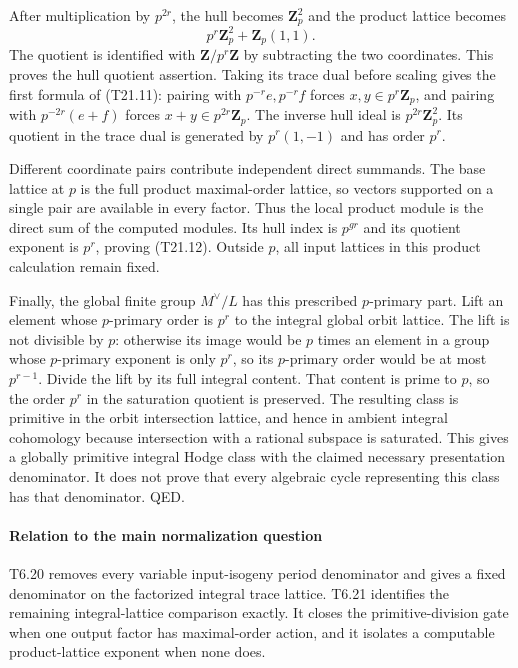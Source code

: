 \documentclass[11pt,a4paper]{article}
\theoremstyle{definition}
\begin{document}
After multiplication by \(p^{2r}\), the hull becomes \(\mathbf Z_p^2\) and the product lattice becomes \[
 p^r\mathbf Z_p^2+\mathbf Z_p(1,1).
\] The quotient is identified with \(\mathbf Z/p^r\mathbf Z\) by subtracting the two coordinates. This proves the hull quotient assertion. Taking its trace dual before scaling gives the first formula of (T21.11): pairing with \(p^{-r}e,p^{-r}f\) forces \(x,y\in p^r\mathbf Z_p\), and pairing with \(p^{-2r}(e+f)\) forces \(x+y\in p^{2r}\mathbf Z_p\). The inverse hull ideal is \(p^{2r}\mathbf Z_p^2\). Its quotient in the trace dual is generated by \(p^r(1,-1)\) and has order \(p^r\).

Different coordinate pairs contribute independent direct summands. The base lattice at \(p\) is the full product maximal-order lattice, so vectors supported on a single pair are available in every factor. Thus the local product module is the direct sum of the computed modules. Its hull index is \(p^{gr}\) and its quotient exponent is \(p^r\), proving (T21.12). Outside \(p\), all input lattices in this product calculation remain fixed.

Finally, the global finite group \(M^\vee/L\) has this prescribed \(p\)-primary part. Lift an element whose \(p\)-primary order is \(p^r\) to the integral global orbit lattice. The lift is not divisible by \(p\): otherwise its image would be \(p\) times an element in a group whose \(p\)-primary exponent is only \(p^r\), so its \(p\)-primary order would be at most \(p^{r-1}\). Divide the lift by its full integral content. That content is prime to \(p\), so the order \(p^r\) in the saturation quotient is preserved. The resulting class is primitive in the orbit intersection lattice, and hence in ambient integral cohomology because intersection with a rational subspace is saturated. This gives a globally primitive integral Hodge class with the claimed necessary presentation denominator. It does not prove that every algebraic cycle representing this class has that denominator. QED.

\paragraph{Relation to the main normalization question}\label{relation-to-the-main-normalization-question}

T6.20 removes every variable input-isogeny period denominator and gives a fixed denominator on the factorized integral trace lattice. T6.21 identifies the remaining integral-lattice comparison exactly. It closes the primitive-division gate when one output factor has maximal-order action, and it isolates a computable product-lattice exponent when none does.
\end{document}
